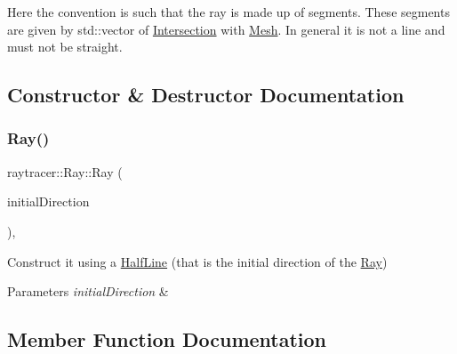 Here the convention is such that the ray is made up of segments. These segments are given by std\+::vector of \hyperlink{structraytracer_1_1Intersection}{Intersection} with \hyperlink{classraytracer_1_1Mesh}{Mesh}. In general it is not a line and must not be straight. 

\subsection{Constructor \& Destructor Documentation}
\mbox{\label{classraytracer_1_1Ray_aa2a51f7caa322193c4b458ba960920f7}} 
\subsubsection{\texorpdfstring{Ray()}{Ray()}}
{\footnotesize\ttfamily raytracer\+::\+Ray\+::\+Ray (\begin{DoxyParamCaption}\item[{const \hyperlink{structraytracer_1_1HalfLine}{Half\+Line} \&}]{initial\+Direction }\end{DoxyParamCaption})\hspace{0.3cm}{\ttfamily [inline]}, {\ttfamily [explicit]}}



Construct it using a \hyperlink{structraytracer_1_1HalfLine}{Half\+Line} (that is the initial direction of the \hyperlink{classraytracer_1_1Ray}{Ray}) 


\begin{DoxyParams}{Parameters}
{\em initial\+Direction} & \\
\hline
\end{DoxyParams}


\subsection{Member Function Documentation}
\mbox{\label{classraytracer_1_1Ray_a9ebcb3641ec730e5b94452833b69c68d}} 
